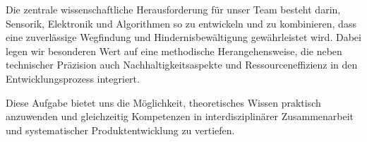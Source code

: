 \documentclass[main.tex]{subfiles} %
\begin{document}
Die zentrale wissenschaftliche Herausforderung für unser Team besteht darin, Sensorik, Elektronik und Algorithmen so zu entwickeln und zu kombinieren, dass eine zuverlässige Wegfindung und Hindernisbewältigung gewährleistet wird. Dabei legen wir besonderen Wert auf eine methodische Herangehensweise, die neben technischer Präzision auch Nachhaltigkeitsaspekte und Ressourceneffizienz in den Entwicklungsprozess integriert.

Diese Aufgabe bietet uns die Möglichkeit, theoretisches Wissen praktisch anzuwenden und gleichzeitig Kompetenzen in interdisziplinärer Zusammenarbeit und systematischer Produktentwicklung zu vertiefen.
\end{document}
